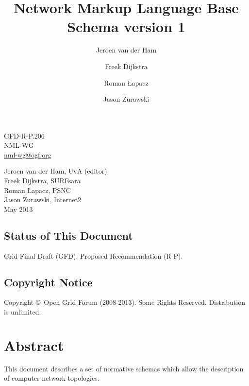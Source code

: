 \documentclass[12pt]{article}  %
\title{Network Markup Language Base Schema version 1}
\author{Jeroen van der Ham \and Freek Dijkstra \and Roman Łapacz \and Jason Zurawski}
\newcommand{\headerstyle}{\sffamily} %
\newcommand{\ifnonempty}[2]{\ifthenelse{\isundefined{#1}}{}{\ifthenelse{\equal{#1}{}}{}{#2}}}
\newcommand{\authorsshort}{Jeroen van der Ham, UvA (editor)\\Freek Dijkstra, SURFsara\\Roman Łapacz, PSNC\\Jason Zurawski, Internet2}
\newcommand{\publicationdate}{May 2013}  %
\newcommand{\copyrightyears}{2008-2013}  %
\newcommand{\docseries}{GFD-R-P.206}  %
\begin{document}
{\noindent
\begin{minipage}[t]{1.5in}
\headerstyle
\docseries \\
NML-WG \\
\href{mailto:nml-wg@ogf.org}{nml-wg@ogf.org}
\end{minipage}
\hfill
\raggedleft
\begin{minipage}[t]{4.5in}
\raggedleft
\headerstyle
\authorsshort \\
\vspace{1em}
\publicationdate \\
\ifnonempty{\revisiondate}{Revised \revisiondate \\}
\end{minipage}
}

\vspace{1em}
\begin{center}
\makeatletter
\Large\bf\textsf \@title
\makeatother
\end{center}


\subsection*{Status of This Document}

Grid Final Draft (GFD), Proposed Recommendation (R-P).


% 

\subsection*{Copyright Notice}

Copyright \copyright \ Open Grid Forum (\copyrightyears).  Some Rights Reserved.  
Distribution is unlimited.

\section*{Abstract}

This document describes a set of normative schemas which allow the
description of computer network topologies.

\tableofcontents
\end{document}
